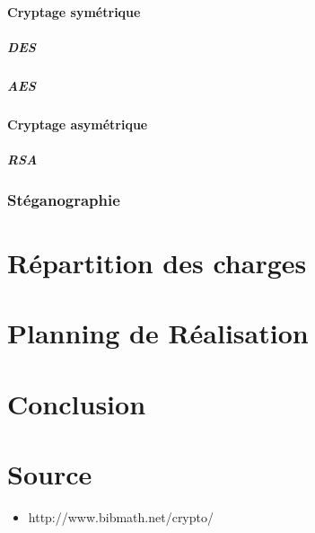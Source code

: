 \documentclass[a4paper,12pt]{article}
\begin{document}
			\subsection{Cryptage symétrique}
			\subsubsection{DES}
			\subsubsection{AES}

			\subsection{Cryptage asymétrique}
			\subsubsection{RSA}

		\section{Stéganographie}
	\newpage
	\part{Répartition des charges}
	\newpage
	\part{Planning de Réalisation} %
	\newpage
	\part{Conclusion}
	\newpage
	\part*{Source}
		\begin{itemize}
			\item  http://www.bibmath.net/crypto/
		\end{itemize}
\end{document}
